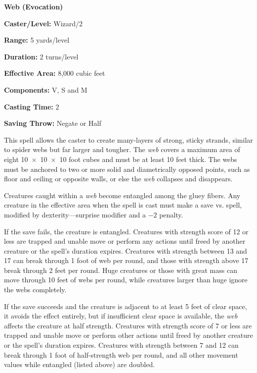 \begin{multicols}{2}
\vspace{1em}

\noindent
\begin{minipage}{\columnwidth}

\noindent \textbf{Web (Evocation)}

\noindent \textbf{Caster/Level:} Wizard/2

\noindent \textbf{Range:} 5 yards/level

\noindent \textbf{Duration:} 2 turns/level

\noindent \textbf{Effective Area:} 8,000 cubic feet

\noindent \textbf{Components:} V, S and M

\noindent \textbf{Casting Time:} 2

\noindent \textbf{Saving Throw:} Negate or Half

\end{minipage}

This spell allows the caster to create many-layers of strong, sticky strands, similar to spider webs but far larger and tougher.  The \textit{web} covers a maximum area of eight 10~$\times$~10~$\times$~10 foot cubes and must be at least 10 feet thick.  The webs must be anchored to two or more solid and diametrically opposed points, such as floor and ceiling or opposite walls, or else the \textit{web} collapses and disappears.  

Creatures caught within a \textit{web} become entangled among the gluey fibers.  Any creature in the effective area when the spell is cast must make a save vs. spell, modified by dexterity---surprise modifier and a $-2$ penalty.  

If the save fails, the creature is entangled.  Creatures with strength score of 12 or less are trapped and unable move or perform any actions until freed by another creature or the spell's duration expires.  Creatures with strength between 13 and 17 can break through 1 foot of web per round, and those with strength above 17 break through 2 feet per round.  Huge creatures or those with great mass can move through 10 feet of webs per round, while creatures larger than huge ignore the webs completely.

If the save succeeds and the creature is adjacent to at least 5 feet of clear space, it avoids the effect entirely, but if insufficient clear space is available, the \textit{web} affects the creature at half strength.  Creatures with strength score of 7 or less are trapped and unable move or perform other actions until freed by another creature or the spell's duration expires.  Creatures with strength between 7 and 12 can break through 1 foot of half-strength web per round, and all other movement values while entangled (listed above) are doubled.


\end{multicols}

